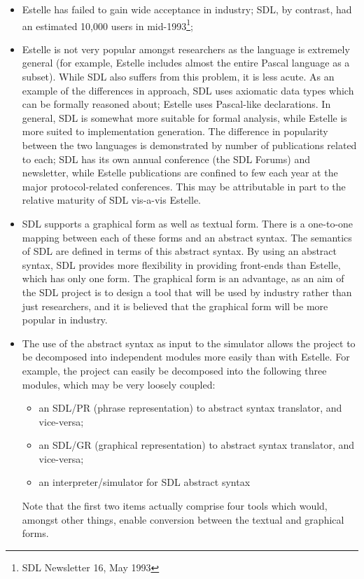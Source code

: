 \begin{itemize}
\item Estelle has failed to gain wide acceptance in industry; SDL, by
contrast, had an estimated 10,000 users in mid-1993\footnote{SDL Newsletter 16,
May 1993};
\item Estelle is not very popular amongst researchers as the language is
extremely general (for example, Estelle includes almost the entire Pascal
language as a subset). While SDL also suffers from this problem, it is less
acute. As an example of the differences in approach, SDL uses axiomatic
data types which can be formally reasoned about; Estelle uses Pascal-like
declarations. In general, SDL is somewhat more suitable for formal
analysis, while Estelle is more suited to implementation generation.
The difference in popularity between the two languages is demonstrated by
number of publications related to each; SDL has its own annual conference
(the SDL Forums) and newsletter, while Estelle publications are confined to
few each year at the major protocol-related conferences. This may be
attributable in part to the relative maturity of SDL vis-a-vis Estelle.
\item SDL supports a graphical form as well as textual form. There is a
one-to-one mapping between each of these forms and an abstract syntax. The
semantics of SDL are defined in terms of this abstract syntax. By using an
abstract syntax, SDL provides more flexibility in providing front-ends than
Estelle, which has only one form. The graphical form is an advantage, as
an aim of the SDL project is to design a tool that will be used by industry
rather than just researchers, and it is believed that the graphical form
will be more popular in industry.
\item The use of the abstract syntax as input to the simulator allows the
project to be decomposed into independent modules more easily than with 
Estelle. For example, the project can easily be decomposed into the
following three modules, which may be very loosely coupled:

\begin{itemize}
\item an SDL/PR (phrase representation) to abstract syntax translator, 
and vice-versa;
\item an SDL/GR (graphical representation) to abstract syntax translator, 
and vice-versa;
\item an interpreter/simulator for SDL abstract syntax
\end{itemize}

Note that the first two items actually comprise four tools which would,
amongst other things, enable conversion between the textual and graphical
forms.
\end{itemize}

